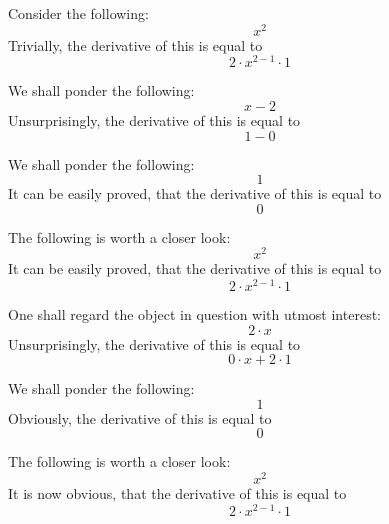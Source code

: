 \documentclass{article}
\begin{document}
Consider the following:
\begin{equation}
x ^{2 } 
\end{equation}
Trivially, the derivative of this is equal to
\begin{equation}
2 \cdot x ^{2 - 1 } \cdot 1 
\end{equation}

We shall ponder the following:
\begin{equation}
x - 2 
\end{equation}
Unsurprisingly, the derivative of this is equal to
\begin{equation}
1 - 0 
\end{equation}

We shall ponder the following:
\begin{equation}
1 
\end{equation}
It can be easily proved, that the derivative of this is equal to
\begin{equation}
0 
\end{equation}

The following is worth a closer look:
\begin{equation}
x ^{2 } 
\end{equation}
It can be easily proved, that the derivative of this is equal to
\begin{equation}
2 \cdot x ^{2 - 1 } \cdot 1 
\end{equation}

One shall regard the object in question with utmost interest:
\begin{equation}
2 \cdot x 
\end{equation}
Unsurprisingly, the derivative of this is equal to
\begin{equation}
0 \cdot x + 2 \cdot 1 
\end{equation}

We shall ponder the following:
\begin{equation}
1 
\end{equation}
Obviously, the derivative of this is equal to
\begin{equation}
0 
\end{equation}

The following is worth a closer look:
\begin{equation}
x ^{2 } 
\end{equation}
It is now obvious, that the derivative of this is equal to
\begin{equation}
2 \cdot x ^{2 - 1 } \cdot 1 
\end{equation}
\end{document}
